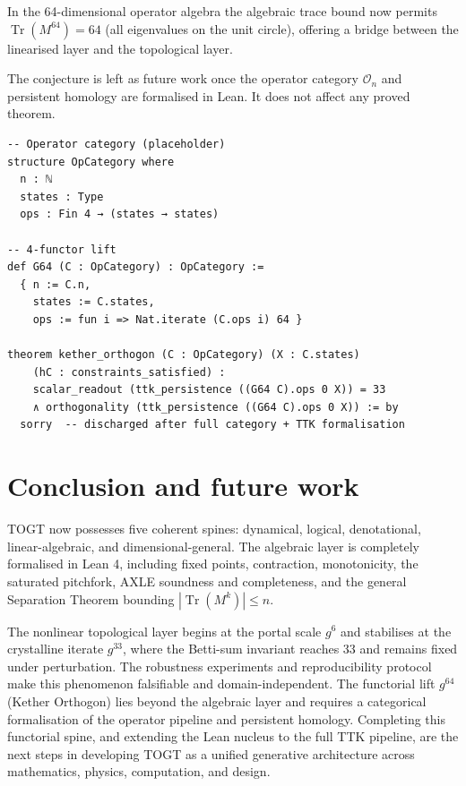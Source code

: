 \documentclass[12pt, oneside]{book}
\theoremstyle{plain}
\theoremstyle{definition}
\theoremstyle{remark}
\begin{document}
In the 64-dimensional operator algebra the algebraic trace bound now permits \(\operatorname{Tr}(M^{64}) = 64\) (all eigenvalues on the unit circle), offering a bridge between the linearised layer and the topological layer.

The conjecture is left as future work once the operator category \(\mathcal{O}_n\) and persistent homology are formalised in Lean. It does not affect any proved theorem.

\begin{lstlisting}[language=Lean, caption={Minimal categorical scaffolding for g^{64} (future work)}]
-- Operator category (placeholder)
structure OpCategory where
  n : ℕ
  states : Type
  ops : Fin 4 → (states → states)

-- 4-functor lift
def G64 (C : OpCategory) : OpCategory :=
  { n := C.n,
    states := C.states,
    ops := fun i => Nat.iterate (C.ops i) 64 }

theorem kether_orthogon (C : OpCategory) (X : C.states)
    (hC : constraints_satisfied) :
    scalar_readout (ttk_persistence ((G64 C).ops 0 X)) = 33
    ∧ orthogonality (ttk_persistence ((G64 C).ops 0 X)) := by
  sorry  -- discharged after full category + TTK formalisation
\end{lstlisting}

\section{Conclusion and future work}

TOGT now possesses five coherent spines: dynamical, logical, denotational, linear-algebraic, and dimensional-general. The algebraic layer is completely formalised in Lean 4, including fixed points, contraction, monotonicity, the saturated pitchfork, AXLE soundness and completeness, and the general Separation Theorem bounding \(|\operatorname{Tr}(M^k)| \leq n\).

The nonlinear topological layer begins at the portal scale \(g^6\) and stabilises at the crystalline iterate \(g^{33}\), where the Betti-sum invariant reaches 33 and remains fixed under perturbation. The robustness experiments and reproducibility protocol make this phenomenon falsifiable and domain-independent. The functorial lift \(g^{64}\) (Kether Orthogon) lies beyond the algebraic layer and requires a categorical formalisation of the operator pipeline and persistent homology. Completing this functorial spine, and extending the Lean nucleus to the full TTK pipeline, are the next steps in developing TOGT as a unified generative architecture across mathematics, physics, computation, and design.
\end{document}
